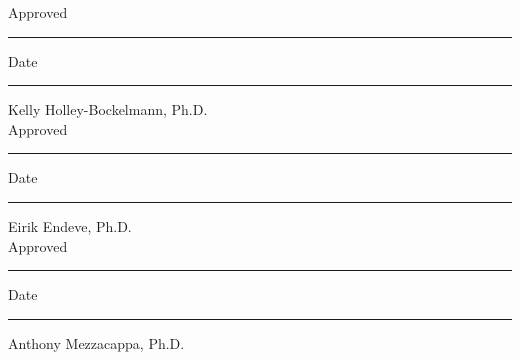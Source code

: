 \documentclass[10pt]{article}
\begin{document}
\noindent Approved \rule[-3pt]{3.5in}{.5pt} \hskip 0.1in %
          Date     \rule[-3pt]{1.5in}{.5pt}
\hspace*{1.3in} Kelly Holley-Bockelmann, Ph.D. \\[0.15in]
\noindent Approved \rule[-3pt]{3.5in}{.5pt} \hskip 0.1in %
          Date     \rule[-3pt]{1.5in}{.5pt}
\hspace*{1.3in} Eirik Endeve, Ph.D. \\[0.15in]
\noindent Approved \rule[-3pt]{3.5in}{.5pt} \hskip 0.1in %
          Date     \rule[-3pt]{1.5in}{.5pt}
\hspace*{1.3in} Anthony Mezzacappa, Ph.D.
\end{document}
